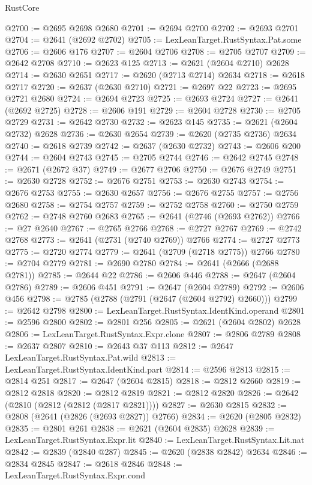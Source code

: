\begin{lexlean}{RustCore}
\begin{coremodule}
@2700 := @2695 @2698 @2680
@2701 := @2694 @2700
@2702 := @2693 @2701
@2704 := @2641 (@2692 @2702)
@2705 := LexLeanTarget.RustSyntax.Pat.some
@2706 := @2606 @176
@2707 := @2604 @2706
@2708 := @2705 @2707
@2709 := @2642 @2708
@2710 := @2623 @125
@2713 := @2621 (@2604 @2710) @2628
@2714 := @2630 @2651
@2717 := @2620 (@2713 @2714) @2634
@2718 := @2618 @2717
@2720 := @2637 (@2630 @2710)
@2721 := @2697 @22
@2723 := @2695 @2721 @2680
@2724 := @2694 @2723
@2725 := @2693 @2724
@2727 := @2641 (@2692 @2725)
@2728 := @2606 @191
@2729 := @2604 @2728
@2730 := @2705 @2729
@2731 := @2642 @2730
@2732 := @2623 @145
@2735 := @2621 (@2604 @2732) @2628
@2736 := @2630 @2654
@2739 := @2620 (@2735 @2736) @2634
@2740 := @2618 @2739
@2742 := @2637 (@2630 @2732)
@2743 := @2606 @200
@2744 := @2604 @2743
@2745 := @2705 @2744
@2746 := @2642 @2745
@2748 := @2671 (@2672 @37)
@2749 := @2677 @2706
@2750 := @2676 @2749
@2751 := @2630 @2728
@2752 := @2676 @2751
@2753 := @2630 @2743
@2754 := @2676 @2753
@2755 := @2630 @2657
@2756 := @2676 @2755
@2757 := @2756 @2680
@2758 := @2754 @2757
@2759 := @2752 @2758
@2760 := @2750 @2759
@2762 := @2748 @2760 @2683
@2765 := @2641 (@2746 (@2693 @2762))
@2766 := @27 @2640
@2767 := @2765 @2766
@2768 := @2727 @2767
@2769 := @2742 @2768
@2773 := @2641 (@2731 (@2740 @2769)) @2766
@2774 := @2727 @2773
@2775 := @2720 @2774
@2779 := @2641 (@2709 (@2718 @2775)) @2766
@2780 := @2704 @2779
@2781 := @2690 @2780
@2784 := @2641 (@2666 (@2688 @2781))
@2785 := @2644 @22
@2786 := @2606 @446
@2788 := @2647 (@2604 @2786)
@2789 := @2606 @451
@2791 := @2647 (@2604 @2789)
@2792 := @2606 @456
@2798 := @2785 (@2788 (@2791 (@2647 (@2604 @2792) @2660)))
@2799 := @2642 @2798
@2800 := LexLeanTarget.RustSyntax.IdentKind.operand
@2801 := @2596 @2800
@2802 := @2801 @256
@2805 := @2621 (@2604 @2802) @2628
@2806 := LexLeanTarget.RustSyntax.Expr.clone
@2807 := @2806 @2789
@2808 := @2637 @2807
@2810 := @2643 @37 @113
@2812 := @2647 LexLeanTarget.RustSyntax.Pat.wild
@2813 := LexLeanTarget.RustSyntax.IdentKind.part
@2814 := @2596 @2813
@2815 := @2814 @251
@2817 := @2647 (@2604 @2815)
@2818 := @2812 @2660
@2819 := @2812 @2818
@2820 := @2812 @2819
@2821 := @2812 @2820
@2826 := @2642 (@2810 (@2812 (@2812 (@2817 @2821))))
@2827 := @2630 @2815
@2832 := @2808 (@2641 (@2826 (@2693 @2827)) @2766)
@2834 := @2620 (@2805 @2832)
@2835 := @2801 @261
@2838 := @2621 (@2604 @2835) @2628
@2839 := LexLeanTarget.RustSyntax.Expr.lit
@2840 := LexLeanTarget.RustSyntax.Lit.nat
@2842 := @2839 (@2840 @287)
@2845 := @2620 (@2838 @2842) @2634
@2846 := @2834 @2845
@2847 := @2618 @2846
@2848 := LexLeanTarget.RustSyntax.Expr.cond

\end{coremodule}
\end{lexlean}
